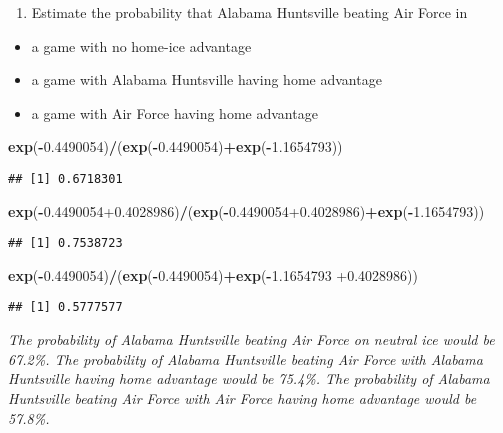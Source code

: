 \documentclass[]{article}
\newenvironment{Shaded}{\begin{snugshade}}{\end{snugshade}}
\newcommand{\FloatTok}[1]{\textcolor[rgb]{0.00,0.00,0.81}{#1}}
\newcommand{\KeywordTok}[1]{\textcolor[rgb]{0.13,0.29,0.53}{\textbf{#1}}}
\newcommand{\NormalTok}[1]{#1}
\newcommand{\OperatorTok}[1]{\textcolor[rgb]{0.81,0.36,0.00}{\textbf{#1}}}
\providecommand{\tightlist}{%
  \setlength{\itemsep}{0pt}\setlength{\parskip}{0pt}}
\begin{document}
\begin{enumerate}
\def\labelenumi{\arabic{enumi}.}
\setcounter{enumi}{1}
\tightlist
\item
  Estimate the probability that Alabama Huntsville beating Air Force in
\end{enumerate}

\begin{itemize}
\tightlist
\item
  a game with no home-ice advantage
\item
  a game with Alabama Huntsville having home advantage
\item
  a game with Air Force having home advantage
\end{itemize}

\begin{Shaded}
\begin{Highlighting}[]
\KeywordTok{exp}\NormalTok{(}\OperatorTok{-}\FloatTok{0.4490054}\NormalTok{)}\OperatorTok{/}\NormalTok{(}\KeywordTok{exp}\NormalTok{(}\OperatorTok{-}\FloatTok{0.4490054}\NormalTok{)}\OperatorTok{+}\KeywordTok{exp}\NormalTok{(}\OperatorTok{-}\FloatTok{1.1654793}\NormalTok{))}
\end{Highlighting}
\end{Shaded}

\begin{verbatim}
## [1] 0.6718301
\end{verbatim}

\begin{Shaded}
\begin{Highlighting}[]
\KeywordTok{exp}\NormalTok{(}\OperatorTok{-}\FloatTok{0.4490054+0.4028986}\NormalTok{)}\OperatorTok{/}\NormalTok{(}\KeywordTok{exp}\NormalTok{(}\OperatorTok{-}\FloatTok{0.4490054+0.4028986}\NormalTok{)}\OperatorTok{+}\KeywordTok{exp}\NormalTok{(}\OperatorTok{-}\FloatTok{1.1654793}\NormalTok{))}
\end{Highlighting}
\end{Shaded}

\begin{verbatim}
## [1] 0.7538723
\end{verbatim}

\begin{Shaded}
\begin{Highlighting}[]
\KeywordTok{exp}\NormalTok{(}\OperatorTok{-}\FloatTok{0.4490054}\NormalTok{)}\OperatorTok{/}\NormalTok{(}\KeywordTok{exp}\NormalTok{(}\OperatorTok{-}\FloatTok{0.4490054}\NormalTok{)}\OperatorTok{+}\KeywordTok{exp}\NormalTok{(}\OperatorTok{-}\FloatTok{1.1654793} \FloatTok{+0.4028986}\NormalTok{))}
\end{Highlighting}
\end{Shaded}

\begin{verbatim}
## [1] 0.5777577
\end{verbatim}

\emph{The probability of Alabama Huntsville beating Air Force on neutral
ice would be 67.2\%. The probability of Alabama Huntsville beating Air
Force with Alabama Huntsville having home advantage would be 75.4\%. The
probability of Alabama Huntsville beating Air Force with Air Force
having home advantage would be 57.8\%.}
\end{document}
